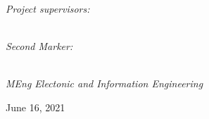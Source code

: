 \begin{titlepage}
\begin{center}
\begin{minipage}[t]{0.4\hsize}
\end{minipage}~\begin{minipage}[t]{0.4\hsize}
    \begin{flushright} \Large
    \textit{Project supervisors:}\\
    \supervisor \\%
    \supervisorassistant
    \end{flushright}
    \vspace{1cm}




    \begin{flushright} \Large
    \textit{Second Marker:}\\
    \secondmarker\\
    \end{flushright}
\end{minipage}
\end{center}

\vspace{7cm}
\begin{flushleft} \Large
\centering
\textit{MEng Electonic and Information Engineering}
\end{flushleft}
\Large
\makeatletter
\centering
June 16, 2021

\vfill %



\makeatother


\end{titlepage}

